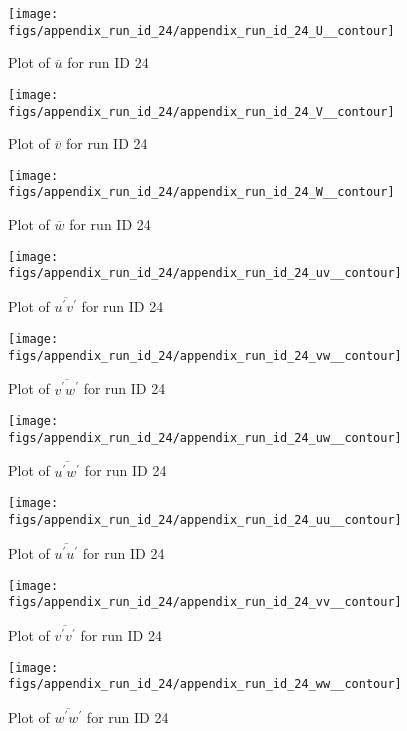 \begin{figure}[H]
\centering
\texttt{[image: figs/appendix\_run\_id\_24/appendix\_run\_id\_24\_U\_\_contour]}
\caption{Plot of $\overline{u}$ for run ID 24}
\label{fig:appendix_run_id_24_U__contour}
\end{figure}


\begin{figure}[H]
\centering
\texttt{[image: figs/appendix\_run\_id\_24/appendix\_run\_id\_24\_V\_\_contour]}
\caption{Plot of $\overline{v}$ for run ID 24}
\label{fig:appendix_run_id_24_V__contour}
\end{figure}


\begin{figure}[H]
\centering
\texttt{[image: figs/appendix\_run\_id\_24/appendix\_run\_id\_24\_W\_\_contour]}
\caption{Plot of $\overline{w}$ for run ID 24}
\label{fig:appendix_run_id_24_W__contour}
\end{figure}


\begin{figure}[H]
\centering
\texttt{[image: figs/appendix\_run\_id\_24/appendix\_run\_id\_24\_uv\_\_contour]}
\caption{Plot of $\overline{u^\prime v^\prime}$ for run ID 24}
\label{fig:appendix_run_id_24_uv__contour}
\end{figure}


\begin{figure}[H]
\centering
\texttt{[image: figs/appendix\_run\_id\_24/appendix\_run\_id\_24\_vw\_\_contour]}
\caption{Plot of $\overline{v^\prime w^\prime}$ for run ID 24}
\label{fig:appendix_run_id_24_vw__contour}
\end{figure}


\begin{figure}[H]
\centering
\texttt{[image: figs/appendix\_run\_id\_24/appendix\_run\_id\_24\_uw\_\_contour]}
\caption{Plot of $\overline{u^\prime w^\prime}$ for run ID 24}
\label{fig:appendix_run_id_24_uw__contour}
\end{figure}


\begin{figure}[H]
\centering
\texttt{[image: figs/appendix\_run\_id\_24/appendix\_run\_id\_24\_uu\_\_contour]}
\caption{Plot of $\overline{u^\prime u^\prime}$ for run ID 24}
\label{fig:appendix_run_id_24_uu__contour}
\end{figure}


\begin{figure}[H]
\centering
\texttt{[image: figs/appendix\_run\_id\_24/appendix\_run\_id\_24\_vv\_\_contour]}
\caption{Plot of $\overline{v^\prime v^\prime}$ for run ID 24}
\label{fig:appendix_run_id_24_vv__contour}
\end{figure}


\begin{figure}[H]
\centering
\texttt{[image: figs/appendix\_run\_id\_24/appendix\_run\_id\_24\_ww\_\_contour]}
\caption{Plot of $\overline{w^\prime w^\prime}$ for run ID 24}
\label{fig:appendix_run_id_24_ww__contour}
\end{figure}


